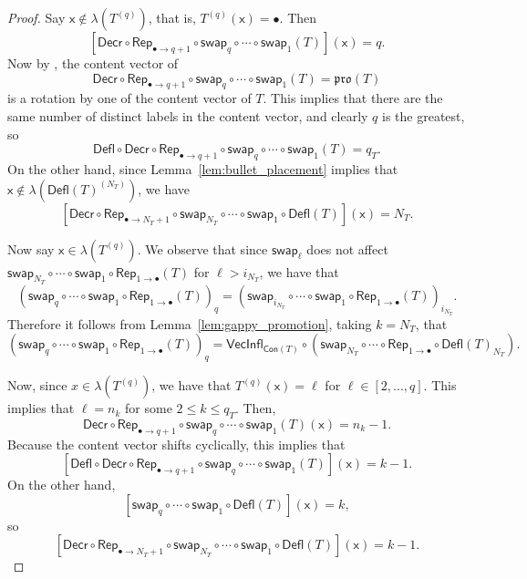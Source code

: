 \documentclass[12pt]{amsart}
\newcommand{\x}{\ensuremath{\mathsf{x}}}
\theoremstyle{definition}
\theoremstyle{remark}
\numberwithin{equation}{section}
\newcommand{\pro}{\mathfrak{pro}}
\newcommand{\swap}{\ensuremath{\mathsf{swap}}}
\newcommand{\decr}{\ensuremath{\mathsf{Decr}}}
\newcommand{\rep}{\ensuremath{\mathsf{Rep}}}
\newcommand{\deflate}{\ensuremath{\mathsf{Defl}}}
\newcommand{\inflate}{\ensuremath{\mathsf{VecInfl}}}
\newcommand{\content}{\ensuremath{\mathsf{Con}}}
\begin{document}
\begin{proof}
Say $\x \not \in \lambda(T^{(q)})$, that is,  $T^{(q)}(\x) = \bullet$.  Then 
\[
[\decr \circ \rep_{\bullet \rightarrow q+1} \circ \swap_q \circ \cdots \circ \swap_1 (T)](\x) = q.
\]
Now by \cite[Lemma~2.1]{DPS}, the content vector of  
\[
\decr \circ \rep_{\bullet \rightarrow q+1} \circ \swap_q \circ \cdots \circ \swap_1 (T) = \pro(T)
\]
 is a rotation by one of the content vector of $T$. This implies that there are the same number of distinct labels in the content vector, and clearly $q$ is the greatest, so 
 \[
 \deflate \circ \decr \circ \rep_{\bullet \rightarrow q+1} \circ \swap_q \circ \cdots \circ \swap_1 (T) = q_T.
 \]
  On the other hand, since Lemma~\ref{lem:bullet_placement} implies that $\x \not \in \lambda(\deflate(T)^{(N_T)})$, we have
  \[
  [\decr \circ \rep_{\bullet \rightarrow N_T + 1} \circ \swap_{N_T} \circ \cdots \circ \swap_1 \circ \deflate(T)](\x) = N_T.
  \] 

Now say $\x \in \lambda(T^{(q)})$. We observe that since $\swap_\ell$ does not affect $\swap_{N_T} \circ \cdots \circ \swap_1 \circ \rep_{1 \rightarrow \bullet} (T)$ for $\ell > i_{N_T}$, we have that
\[ (\swap_q \circ \cdots \circ \swap_1 \circ \rep_{1 \rightarrow \bullet}( T ))_q = (\swap_{i_{N_T}} \circ \cdots \circ \swap_1 \circ \rep_{1 \rightarrow \bullet}( T ))_{i_{N_T}}.  \]
Therefore it follows from Lemma~\ref{lem:gappy_promotion}, taking $k = N_T$, that 
\[ (\swap_q \circ \cdots \circ \swap_1 \circ \rep_{1 \rightarrow \bullet}( T ))_q = \inflate_{\content(T)} \circ (\swap_{N_T} \circ \cdots \circ  \rep_{1 \rightarrow \bullet} \circ \deflate(T)_{N_T}). \]

Now, since $x \in \lambda(T^{(q)})$, we have that $T^{(q)}(\x) = \ell$ for $\ell \in [2,...,q]$. This implies that $\ell = n_k$ for some $2 \leq k \leq q_T$. Then, 
\[
\decr \circ \rep_{\bullet \to q+1} \circ \swap_q \circ \cdots \circ \swap_1 (T)(\x) = n_k-1.
\]
Because the content vector shifts cyclically, this implies that 
 \[
 [\deflate \circ \decr \circ \rep_{\bullet \rightarrow q+1} \circ \swap_q \circ \cdots \circ \swap_1 (T)](\x) = k-1.
 \]
  On the other hand, 
  \[
  [\swap_q \circ \cdots \circ \swap_1 \circ \deflate(T)](\x) = k,
  \]
   so 
   \[
   [\decr \circ \rep_{\bullet \rightarrow N_T + 1} \circ \swap_{N_T} \circ \cdots \circ \swap_1 \circ  \deflate(T)](\x) = k-1.\]
\end{proof}
\end{document}
